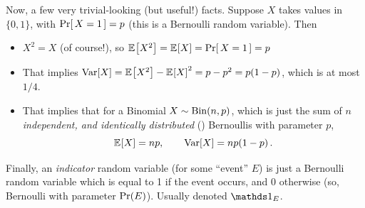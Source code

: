 Now, a few very trivial-looking (but useful!) facts. Suppose $X$ takes values in $\{0,1\}$, with $\probaOf{X=1}=p$ (this is a Bernoulli random variable). Then
\begin{itemize}
    \item $X^2=X$ (of course!), so $\bEE{X^2}=\bEE{X}=\probaOf{X=1}=p$
    \item That implies $\var[X] = \bEE{X^2}-\bEE{X}^2 = p-p^2 = p(1-p)$, which is at most $1/4$.
    \item That implies that for a Binomial $X\sim\binomial{n}{p}$, which is just the sum of $n$ \emph{independent, and identically distributed} (\iid) Bernoullis with parameter $p$,
    \[
        \bEE{X} = np, \qquad \var[X] = np(1-p)\,.
    \]
\end{itemize}
Finally, an \emph{indicator} random variable (for some ``event'' $E$) is just a Bernoulli random variable which is equal to 1 if the event occurs, and 0 otherwise (so, Bernoulli with parameter $\Pr(E)$). Usually denoted $\indicSet{E}$.